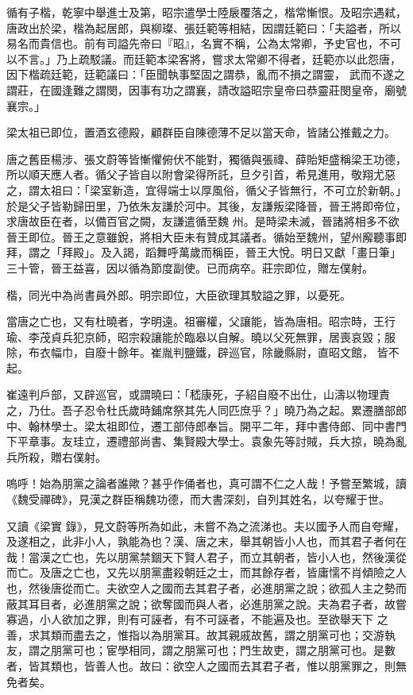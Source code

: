 \begin{pinyinscope}
 循有子楷，乾寧中舉進士及第，昭宗遣學士陸扆覆落之，楷常慚恨。及昭宗遇弒，唐政出於梁，楷為起居郎，與柳璨、張廷範等相結，因謂廷範曰：「夫謚者，所以易名而貴信也。前有司謚先帝曰『昭』，名實不稱，公為太常卿，予史官也，不可以不言。」乃上疏駁議。而廷範本梁客將，嘗求太常卿不得者，廷範亦以此怨唐，因下楷疏廷範，廷範議曰：「臣聞執事堅固之謂恭，亂而不損之謂靈，
 武而不遂之謂莊，在國逢難之謂閔，因事有功之謂襄，請改謚昭宗皇帝曰恭靈莊閔皇帝，廟號襄宗。」



 梁太祖已即位，置酒玄德殿，顧群臣自陳德薄不足以當天命，皆諸公推戴之力。



 唐之舊臣楊涉、張文蔚等皆慚懼俯伏不能對，獨循與張禕、薛貽矩盛稱梁王功德，所以順天應人者。循父子皆自以附會梁得所託，旦夕引首，希見進用，敬翔尤惡之，謂太祖曰：「梁室新造，宜得端士以厚風俗，循父子皆無行，不可立於新朝。」於是父子皆勒歸田里，乃依朱友謙於河中。其後，友謙叛梁降晉，晉王將即帝位，求唐故臣在者，以備百官之闕，友謙遣循至魏
 州。是時梁未滅，晉諸將相多不欲晉王即位。晉王之意雖銳，將相大臣未有贊成其議者。循始至魏州，望州廨聽事即拜，謂之「拜殿」。及入謁，蹈舞呼萬歲而稱臣，晉王大悅。明日又獻「畫日筆」三十管，晉王益喜，因以循為節度副使。已而病卒。莊宗即位，贈左僕射。



 楷，同光中為尚書員外郎。明宗即位，大臣欲理其駮謚之罪，以憂死。



 當唐之亡也，又有杜曉者，字明遠。祖審權，父讓能，皆為唐相。昭宗時，王行瑜、李茂貞兵犯京師，昭宗殺讓能於臨皋以自解。曉以父死無罪，居喪哀毀；服除，布衣幅巾，自廢十餘年。崔胤判鹽鐵，辟巡官，除畿縣尉，直昭文館，
 皆不起。



 崔遠判戶部，又辟巡官，或謂曉曰：「嵇康死，子紹自廢不出仕，山濤以物理責之，乃仕。吾子忍令杜氏歲時鋪席祭其先人同匹庶乎？」曉乃為之起。累遷膳部郎中、翰林學士。梁太祖即位，遷工部侍郎奉旨。開平二年，拜中書侍郎、同中書門下平章事。友珪立，遷禮部尚書、集賢殿大學士。袁象先等討賊，兵大掠，曉為亂兵所殺，贈右僕射。



 嗚呼！始為朋黨之論者誰歟？甚乎作俑者也，真可謂不仁之人哉！予嘗至繁城，讀《魏受禪碑》，見漢之群臣稱魏功德，而大書深刻，自列其姓名，以夸耀于世。



 又讀《梁實
 錄》，見文蔚等所為如此，未嘗不為之流涕也。夫以國予人而自夸耀，及遂相之，此非小人，孰能為也？漢、唐之末，舉其朝皆小人也，而其君子者何在哉！當漢之亡也，先以朋黨禁錮天下賢人君子，而立其朝者，皆小人也，然後漢從而亡。及唐之亡也，又先以朋黨盡殺朝廷之士，而其餘存者，皆庸懦不肖傾險之人也，然後唐從而亡。夫欲空人之國而去其君子者，必進朋黨之說；欲孤人主之勢而蔽其耳目者，必進朋黨之說；欲奪國而與人者，必進朋黨之說。夫為君子者，故嘗寡過，小人欲加之罪，則有可誣者，有不可誣者，不能遍及也。至欲舉天下
 之善，求其類而盡去之，惟指以為朋黨耳。故其親戚故舊，謂之朋黨可也；交游執友，謂之朋黨可也；宦學相同，謂之朋黨可也；門生故吏，謂之朋黨可也。是數者，皆其類也，皆善人也。故曰：欲空人之國而去其君子者，惟以朋黨罪之，則無免者矣。




\end{pinyinscope}
